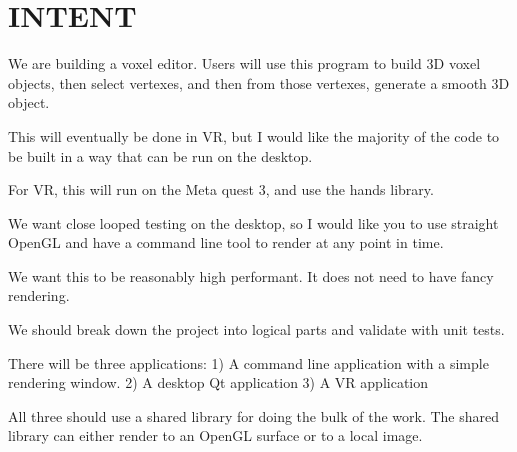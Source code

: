 \chapter{INTENT }
\hypertarget{md__i_n_t_e_n_t}{}\label{md__i_n_t_e_n_t}
We are building a voxel editor. Users will use this program to build 3D voxel objects, then select vertexes, and then from those vertexes, generate a smooth 3D object.

This will eventually be done in VR, but I would like the majority of the code to be built in a way that can be run on the desktop.

For VR, this will run on the Meta quest 3, and use the hands library.

We want close looped testing on the desktop, so I would like you to use straight Open\+GL and have a command line tool to render at any point in time.

We want this to be reasonably high performant. It does not need to have fancy rendering.

We should break down the project into logical parts and validate with unit tests.

There will be three applications\+: 1) A command line application with a simple rendering window. 2) A desktop Qt application 3) A VR application

All three should use a shared library for doing the bulk of the work. The shared library can either render to an Open\+GL surface or to a local image. 